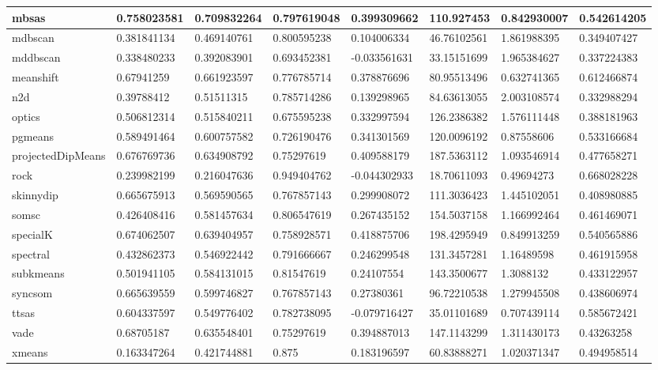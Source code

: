 \begin{table}[H]
\begin{tabular}{|l|l|l|l|l|l|l|l|}
\hline
mbsas & 0.758023581 & 0.709832264 & 0.797619048 & 0.399309662 & 110.927453 & 0.842930007 & 0.542614205 \\
\hline
mdbscan & 0.381841134 & 0.469140761 & 0.800595238 & 0.104006334 & 46.76102561 & 1.861988395 & 0.349407427 \\
\hline
mddbscan & 0.338480233 & 0.392083901 & 0.693452381 & -0.033561631 & 33.15151699 & 1.965384627 & 0.337224383 \\
\hline
meanshift & 0.67941259 & 0.661923597 & 0.776785714 & 0.378876696 & 80.95513496 & 0.632741365 & 0.612466874 \\
\hline
n2d & 0.39788412 & 0.51511315 & 0.785714286 & 0.139298965 & 84.63613055 & 2.003108574 & 0.332988294 \\
\hline
optics & 0.506812314 & 0.515840211 & 0.675595238 & 0.332997594 & 126.2386382 & 1.576111448 & 0.388181963 \\
\hline
pgmeans & 0.589491464 & 0.600757582 & 0.726190476 & 0.341301569 & 120.0096192 & 0.87558606 & 0.533166684 \\
\hline
projectedDipMeans & 0.676769736 & 0.634908792 & 0.75297619 & 0.409588179 & 187.5363112 & 1.093546914 & 0.477658271 \\
\hline
rock & 0.239982199 & 0.216047636 & 0.949404762 & -0.044302933 & 18.70611093 & 0.49694273 & 0.668028228 \\
\hline
skinnydip & 0.665675913 & 0.569590565 & 0.767857143 & 0.299908072 & 111.3036423 & 1.445102051 & 0.408980885 \\
\hline
somsc & 0.426408416 & 0.581457634 & 0.806547619 & 0.267435152 & 154.5037158 & 1.166992464 & 0.461469071 \\
\hline
specialK & 0.674062507 & 0.639404957 & 0.758928571 & 0.418875706 & 198.4295949 & 0.849913259 & 0.540565886 \\
\hline
spectral & 0.432862373 & 0.546922442 & 0.791666667 & 0.246299548 & 131.3457281 & 1.16489598 & 0.461915958 \\
\hline
subkmeans & 0.501941105 & 0.584131015 & 0.81547619 & 0.24107554 & 143.3500677 & 1.3088132 & 0.433122957 \\
\hline
syncsom & 0.665639559 & 0.599746827 & 0.767857143 & 0.27380361 & 96.72210538 & 1.279945508 & 0.438606974 \\
\hline
ttsas & 0.604337597 & 0.549776402 & 0.782738095 & -0.079716427 & 35.01101689 & 0.707439114 & 0.585672421 \\
\hline
vade & 0.68705187 & 0.635548401 & 0.75297619 & 0.394887013 & 147.1143299 & 1.311430173 & 0.43263258 \\
\hline
xmeans & 0.163347264 & 0.421744881 & 0.875 & 0.183196597 & 60.83888271 & 1.020371347 & 0.494958514 \\
\hline
\end{tabular}
\end{table}

